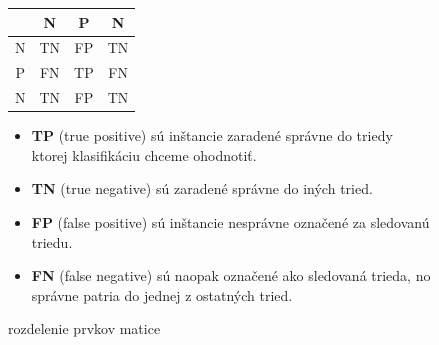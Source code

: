             \begin{figure}[!h]
                \begin{minipage}[b]{0.38\textwidth}
                    \begin{tabular}{c|c|c|c|}
                          & N  &  P & N  \\
                        \hline
                        N & TN & FP & TN \\
                        \hline
                        P & FN & TP & FN \\
                        \hline
                        N & TN & FP & TN \\
                        \hline
                    \end{tabular}
                    \centering
                    \caption{rozdelenie prvkov matice}
                    \label{fig:example_confusion_matrix}
                \end{minipage}
                \begin{minipage}[b]{0.6\textwidth}
                    \begin{itemize}
                        \item \textbf{TP} (true positive) sú inštancie zaradené správne do triedy ktorej klasifikáciu chceme ohodnotiť.
                        \item \textbf{TN} (true negative) sú zaradené správne do iných tried.
                        \item \textbf{FP} (false positive) sú inštancie nesprávne označené za sledovanú triedu.
                        \item \textbf{FN} (false negative) sú naopak označené ako sledovaná trieda, no správne patria do jednej z ostatných tried.
                    \end{itemize}
                \end{minipage}
            \end{figure}

